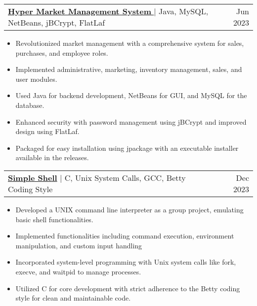 \documentclass[letterpaper,10.5pt]{article}
\makeatletter
\newcommand{\resumeItem}[1]{
  \item\small{
    {#1 \vspace{-2pt}}
  }
}
\newcommand{\resumeProjectHeading}[2]{
    \vspace{-2pt}\item
    \begin{tabular*}{0.97\textwidth}{l@{\extracolsep{\fill}}r}
      \small#1 & #2 \\
    \end{tabular*}\vspace{-7pt}
}
\newcommand{\resumeItemListStart}{\begin{itemize}}
\newcommand{\resumeItemListEnd}{\end{itemize}\vspace{-5pt}}
\makeatother
\begin{document}
      \resumeProjectHeading
        {\href{https://github.com/Hassan220022/Hyper-Market-Management-System}{\textbf{Hyper Market Management System }}
        $|$
          {Java, MySQL, NetBeans, jBCrypt, FlatLaf}}{Jun 2023}
          \resumeItemListStart
            \resumeItem{Revolutionized market management with a comprehensive system for sales, purchases, and employee roles.}
            \resumeItem{Implemented administrative, marketing, inventory management, sales, and user modules.}
            \resumeItem{Used Java for backend development, NetBeans for GUI, and MySQL for the database.}
            \resumeItem{Enhanced security with password management using jBCrypt and improved design using FlatLaf.}
            \resumeItem{Packaged for easy installation using jpackage with an executable installer available in the releases.}
          \resumeItemListEnd

      \resumeProjectHeading
        {\href{https://github.com/Hassan220022/simple_shell}{\textbf{Simple Shell}}
        $|$
          {C, Unix System Calls, GCC, Betty Coding Style}}{Dec 2023}
          \resumeItemListStart
            \resumeItem{Developed a UNIX command line interpreter as a group project, emulating basic shell functionalities.}
            \resumeItem{Implemented functionalities including command execution, environment manipulation, and custom input handling}
            \resumeItem{Incorporated system-level programming with Unix system calls like fork, execve, and waitpid to manage processes.}
            \resumeItem{Utilized C for core development with strict adherence to the Betty coding style for clean and maintainable code.}
          \resumeItemListEnd

\end{document}
